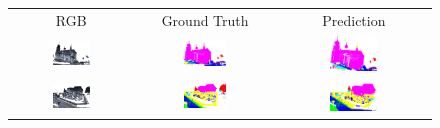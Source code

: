     \begin{figure}[h!]
        \begin{tabular}{ccc}
            RGB & Ground Truth & Prediction \\
            \includegraphics[width=0.33\textwidth, height=0.18\textheight]{images/seg_output/sem3d_seg_output/1_RGB.png} &
            \includegraphics[width=0.33\textwidth, height=0.18\textheight]{images/seg_output/sem3d_seg_output/1_GT.png}& 
            \includegraphics[width=0.33\textwidth, height=0.18\textheight]{images/seg_output/flipout/sem3d_1.png}\\

            \includegraphics[width=0.33\textwidth, height=0.18\textheight]{images/seg_output/sem3d_seg_output/2_RGB.png} &
            \includegraphics[width=0.33\textwidth, height=0.18\textheight]{images/seg_output/sem3d_seg_output/2_GT.png}& 
            \includegraphics[width=0.33\textwidth, height=0.18\textheight]{images/seg_output/flipout/sem3d_2.png}\\


\end{tabular}
\end{figure}
